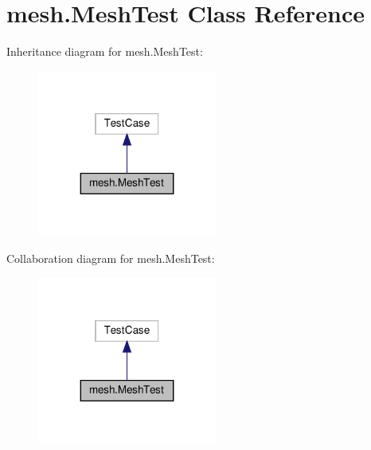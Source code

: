 \hypertarget{classmesh_1_1MeshTest}{}\section{mesh.\+Mesh\+Test Class Reference}
\label{classmesh_1_1MeshTest}


Inheritance diagram for mesh.\+Mesh\+Test\+:\nopagebreak
\begin{figure}[H]
\begin{center}
\leavevmode
\includegraphics[width=167pt]{classmesh_1_1MeshTest__inherit__graph}
\end{center}
\end{figure}


Collaboration diagram for mesh.\+Mesh\+Test\+:\nopagebreak
\begin{figure}[H]
\begin{center}
\leavevmode
\includegraphics[width=167pt]{classmesh_1_1MeshTest__coll__graph}
\end{center}
\end{figure}
